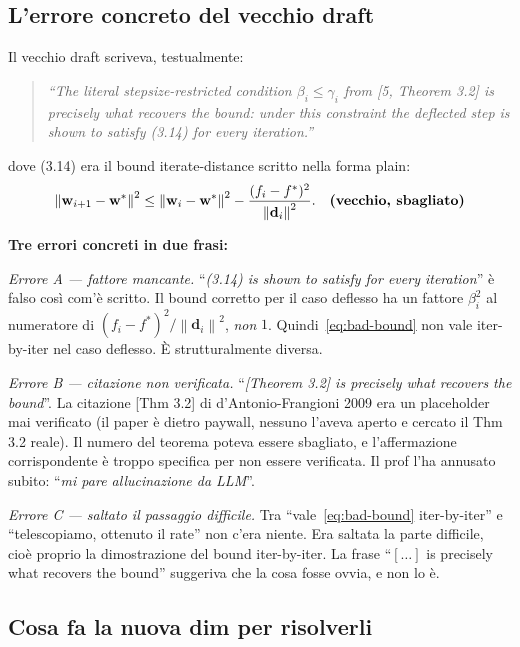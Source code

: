 \documentclass[11pt,a4paper]{article}
\newcommand{\norm}[1]{\left\|#1\right\|}
\newcommand{\bw}{\mathbf{w}}
\newcommand{\bd}{\mathbf{d}}
\theoremstyle{definition}
\begin{document}
\subsection{L'errore concreto del vecchio draft}

Il vecchio draft scriveva, testualmente:
\begin{quote}\itshape
``The literal stepsize-restricted condition $\beta_i \le \gamma_i$ from [5, Theorem 3.2] is precisely what recovers the bound: under this constraint the deflected step is shown to satisfy (3.14) for every iteration.''
\end{quote}
dove (3.14) era il bound iterate-distance scritto nella forma plain:
\begin{equation}
\label{eq:bad-bound}
\norm{\bw_{i+1}-\bw^*}^2 \le \norm{\bw_i-\bw^*}^2 - \frac{(f_i-f^*)^2}{\norm{\bd_i}^2}. \quad\text{\textbf{(vecchio, sbagliato)}}
\end{equation}

\textbf{Tre errori concreti in due frasi:}

\emph{Errore A — fattore mancante.} ``\emph{(3.14) is shown to satisfy for every iteration}'' è falso così com'è scritto. Il bound corretto per il caso deflesso ha un fattore $\beta_i^2$ al numeratore di $(f_i-f^*)^2/\norm{\bd_i}^2$, \emph{non} $1$. Quindi~\eqref{eq:bad-bound} non vale iter-by-iter nel caso deflesso. È strutturalmente diversa.

\emph{Errore B — citazione non verificata.} ``\emph{[Theorem 3.2] is precisely what recovers the bound}''. La citazione [Thm 3.2] di d'Antonio-Frangioni 2009 era un placeholder mai verificato (il paper è dietro paywall, nessuno l'aveva aperto e cercato il Thm 3.2 reale). Il numero del teorema poteva essere sbagliato, e l'affermazione corrispondente è troppo specifica per non essere verificata. Il prof l'ha annusato subito: ``\emph{mi pare allucinazione da LLM}''.

\emph{Errore C — saltato il passaggio difficile.} Tra ``vale~\eqref{eq:bad-bound} iter-by-iter'' e ``telescopiamo, ottenuto il rate'' non c'era niente. Era saltata la parte difficile, cioè proprio la dimostrazione del bound iter-by-iter. La frase ``$[\dots]$ is precisely what recovers the bound'' suggeriva che la cosa fosse ovvia, e non lo è.

\subsection{Cosa fa la nuova dim per risolverli}
\end{document}
